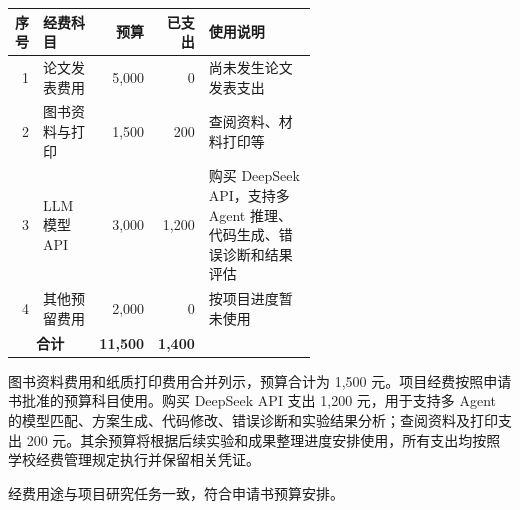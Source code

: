 \documentclass[UTF8,a4paper,zihao=-4]{ctexart}
\begin{document}
\begin{table}[H]
\centering
\begin{tabular}{|r|>{\raggedright\arraybackslash}p{0.2\linewidth}|r|r|>{\raggedright\arraybackslash}p{0.4\linewidth}|}
\hline
\textbf{序号} & \textbf{经费科目} & \textbf{预算} & \textbf{已支出} & \textbf{使用说明} \\
\hline
1 & 论文发表费用 & 5,000 & 0 & 尚未发生论文发表支出 \\
\hline
2 & 图书资料与打印 & 1,500 & 200 & 查阅资料、材料打印等 \\
\hline
3 & LLM 模型 API & 3,000 & 1,200 & 购买 DeepSeek API，支持多 Agent 推理、代码生成、错误诊断和结果评估 \\
\hline
4 & 其他预留费用 & 2,000 & 0 & 按项目进度暂未使用 \\
\hline
\multicolumn{2}{|c|}{\textbf{合计}} & \textbf{11,500} & \textbf{1,400} & \\
\hline
\end{tabular}
\end{table}

图书资料费用和纸质打印费用合并列示，预算合计为 1,500 元。项目经费按照申请书批准的预算科目使用。购买 DeepSeek API 支出 1,200 元，用于支持多 Agent 的模型匹配、方案生成、代码修改、错误诊断和实验结果分析；查阅资料及打印支出 200 元。其余预算将根据后续实验和成果整理进度安排使用，所有支出均按照学校经费管理规定执行并保留相关凭证。

经费用途与项目研究任务一致，符合申请书预算安排。
\end{document}
